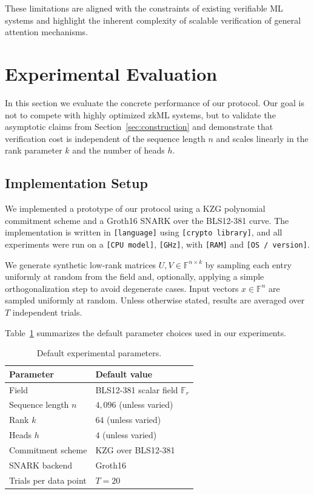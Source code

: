\documentclass[11pt]{article}
\begin{document}
These limitations are aligned with the constraints of existing
verifiable ML systems and highlight the inherent complexity of scalable
verification of general attention mechanisms.

\section{Experimental Evaluation}
\label{sec:experiments}

In this section we evaluate the concrete performance of our protocol.
Our goal is not to compete with highly optimized zkML systems, but to
validate the asymptotic claims from Section~\ref{sec:construction} and
demonstrate that verification cost is independent of the sequence length
$n$ and scales linearly in the rank parameter $k$ and the number of
heads $h$.

\subsection{Implementation Setup}
\label{subsec:impl-setup}

We implemented a prototype of our protocol using a KZG polynomial
commitment scheme and a Groth16 SNARK over the BLS12-381 curve.
The implementation is written in \texttt{[language]} using
\texttt{[crypto library]}, and all experiments were run on a
\texttt{[CPU model]}, \texttt{[GHz]}, with \texttt{[RAM]} and
\texttt{[OS / version]}.

We generate synthetic low-rank matrices
$U, V \in \mathbb{F}^{n \times k}$ by sampling each entry uniformly at
random from the field and, optionally, applying a simple orthogonalization
step to avoid degenerate cases.
Input vectors $x \in \mathbb{F}^n$ are sampled uniformly at random.
Unless otherwise stated, results are averaged over $T$ independent
trials.

Table~\ref{tab:params} summarizes the default parameter choices used in
our experiments.

\begin{table}[t]
  \centering
  \begin{tabular}{l l}
    \toprule
    Parameter & Default value \\
    \midrule
    Field & BLS12-381 scalar field $\mathbb{F}_r$ \\
    Sequence length $n$ & $4{,}096$ (unless varied) \\
    Rank $k$ & $64$ (unless varied) \\
    Heads $h$ & $4$ (unless varied) \\
    Commitment scheme & KZG over BLS12-381 \\
    SNARK backend & Groth16 \\
    Trials per data point & $T = 20$ \\
    \bottomrule
  \end{tabular}
  \caption{Default experimental parameters.}
  \label{tab:params}
\end{table}
\end{document}

